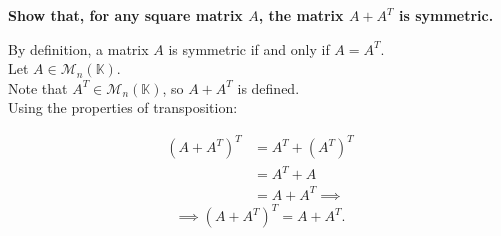 
\item {\bfseries\boldmath
    Show that, for any square matrix $A$,
    the matrix $A+A^T$ is symmetric.
}

\begin{answer}
    By definition, a matrix $A$ is symmetric
    if and only if $A=A^T$.\\

    Let $A\in\mathcal{M}_n(\mathbb{K})$.\\
    Note that $A^T\in\mathcal{M}_n(\mathbb{K})$, so $A+A^T$ is defined.\\

    Using the properties of transposition:

    $$
    \begin{aligned}
        (A+A^T)^T
        &= A^T+(A^T)^T \\
        &= A^T+A \\
        &= A+A^T \implies
    \end{aligned}
    $$
    $$
        \implies \boxed{(A+A^T)^T=A+A^T}.
    $$
\end{answer}
